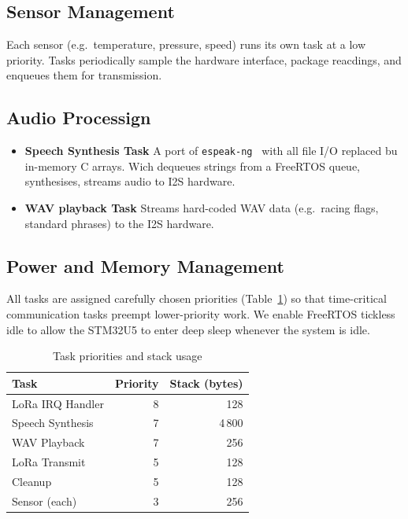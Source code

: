 \subsection{Sensor Management}
Each sensor (e.g.\ temperature, pressure, speed) runs its own task at a low priority. Tasks periodically sample the hardware interface, package reacdings, and enqueues them for transmission.

\subsection{Audio Processign}
\begin{itemize}
  \item \textbf{Speech Synthesis Task}
    A port of \texttt{espeak-ng}~\cite{espeakng} with all file I/O replaced bu in-memory C arrays. Wich dequeues strings from a FreeRTOS queue, synthesises, streams audio to I2S hardware.
  \item \textbf{WAV playback Task}
    Streams hard-coded WAV data (e.g.\ racing flags, standard phrases) to the I2S hardware.
\end{itemize}

\subsection{Power and Memory Management}

All tasks are assigned carefully chosen priorities (Table~\ref{tab:priorities}) so that time-critical communication tasks preempt lower-priority work. We enable FreeRTOS tickless idle to allow the STM32U5 to enter deep sleep whenever the system is idle.

\begin{table}[H]
  \centering
  \caption{Task priorities and stack usage}
  \label{tab:priorities}
  \begin{tabular}{lrr}
    \hline
    Task                     & Priority & Stack (bytes) \\
    \hline
    LoRa IRQ Handler         & 8        & 128            \\
    Speech Synthesis         & 7        & 4\,800         \\
    WAV Playback             & 7        & 256            \\
    LoRa Transmit            & 5        & 128            \\
    Cleanup                  & 5        & 128            \\
    Sensor (each)            & 3        & 256            \\
    \hline
  \end{tabular}
\end{table}
